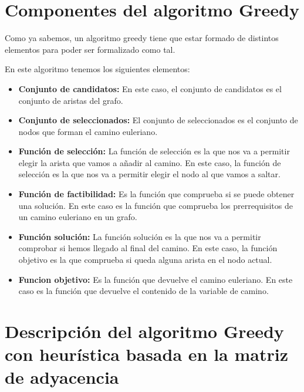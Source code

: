 \tableofcontents %

\newpage


\section{Componentes del algoritmo Greedy}
Como ya sabemos, un algoritmo greedy tiene que estar formado de distintos elementos para poder ser formalizado como tal.
\vspace{5mm}

En este algoritmo tenemos los siguientes elementos:
\begin{itemize}
    \item \textbf{Conjunto de candidatos:} En este caso, el conjunto de candidatos es el conjunto de aristas del grafo.
    \item \textbf{Conjunto de seleccionados:} El conjunto de seleccionados es el conjunto de nodos que forman el camino euleriano.
    \item \textbf{Función de selección:} La función de selección es la que nos va a permitir elegir la arista que vamos a añadir al camino. En este caso, la función de selección es la que nos va a permitir elegir el nodo al que vamos a saltar.
    \item \textbf{Función de factibilidad:} Es la función que comprueba si se puede obtener una solución. En este caso es la función que comprueba los prerrequisitos de un camino euleriano en un grafo.
    \item \textbf{Función solución:} La función solución es la que nos va a permitir comprobar si hemos llegado al final del camino. En este caso, la función objetivo es la que comprueba si queda alguna arista en el nodo actual.
    \item \textbf{Funcion objetivo:} Es la función que devuelve el camino euleriano. En este caso es la función que devuelve el contenido de la variable de camino.
\end{itemize}

\section{Descripción del algoritmo Greedy con heurística basada en la matriz de adyacencia}

